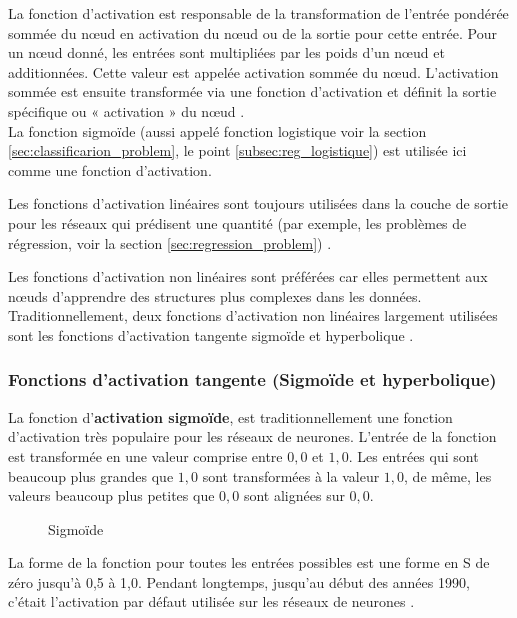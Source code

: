 	La fonction d'activation est responsable de la transformation de l'entrée pondérée sommée du nœud en activation du nœud ou de la sortie pour cette entrée.
	Pour un nœud donné, les entrées sont multipliées par les poids d'un nœud et additionnées. Cette valeur est appelée activation sommée du nœud. L'activation sommée est ensuite transformée via une fonction d'activation et définit la sortie spécifique ou « activation » du nœud \cite{ml2008python}.\\
	La fonction sigmoïde (aussi appelé fonction logistique voir la  section \ref{sec:classificarion_problem}, le point \ref{subsec:reg_logistique}) est utilisée ici comme une fonction d'activation.	
	
	Les fonctions d'activation linéaires sont toujours utilisées dans la couche de sortie pour les réseaux qui prédisent une quantité (par exemple, les problèmes de régression, voir la section \ref{sec:regression_problem}) \cite{geron2017hands, krizhevsky2012imagenet}.
	
	Les fonctions d'activation non linéaires sont préférées car elles permettent aux nœuds d'apprendre des structures plus complexes dans les données. Traditionnellement, deux fonctions d'activation non linéaires largement utilisées sont les fonctions d'activation tangente sigmoïde et hyperbolique \cite{goodfellow2016deep}.
	
	\subsubsection{Fonctions d'activation tangente (Sigmoïde et  hyperbolique)}
	
	
	La fonction d'\textbf{activation sigmoïde}, est traditionnellement une fonction d'activation très populaire pour les réseaux de neurones. L'entrée de la fonction est transformée en une valeur comprise entre $0,0$ et $1,0$. Les entrées qui sont beaucoup plus grandes que $1,0$ sont transformées à la valeur $1,0$, de même, les valeurs beaucoup plus petites que $0,0$ sont alignées sur $0,0$.\\ 
	\begin{figure}
		\caption[Sigmoïde graphique]{Sigmoïde}
		\label{fig:sigmoid-graph}
	\end{figure} 
	La forme de la fonction pour toutes les entrées possibles est une forme en S de zéro jusqu'à 0,5 à 1,0. Pendant longtemps, jusqu'au début des années 1990, c'était l'activation par défaut utilisée sur les réseaux de neurones \cite{krizhevsky2012imagenet}.
	

